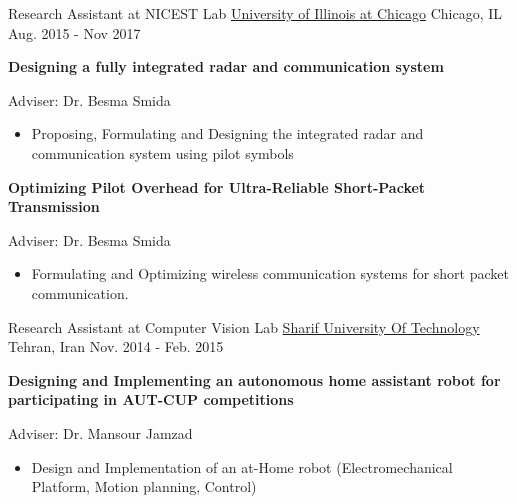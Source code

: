 \begin{cventries}

  \cventry
    {Research Assistant at NICEST Lab} %
    {\href{http://www.uic.edu}{University of Illinois at Chicago}} %
    {Chicago, IL} %
    {Aug. 2015 - Nov 2017} %
    {
      \begin{cvitems} %
		\item \textbf{Designing a fully integrated radar and communication system} \begin{flushright} {\color{awesome} Adviser: Dr. Besma Smida} \end{flushright}
		\begin{itemize}
				\item Proposing, Formulating and Designing the integrated radar and communication system using pilot symbols
		\end{itemize}
		\item \textbf{Optimizing Pilot Overhead for Ultra-Reliable Short-Packet Transmission} \begin{flushright} {\color{awesome} Adviser: Dr. Besma Smida} \end{flushright}
		\begin{itemize}
				\item Formulating and Optimizing wireless communication systems for short packet communication.
		\end{itemize}				      
      \end{cvitems}
    }





  \cventry
    {Research Assistant at Computer Vision Lab} %
    {\href{http://www.sharif.ir/web/en}{Sharif University Of Technology}} %
    {Tehran, Iran} %
    {Nov. 2014 - Feb. 2015} %
    {
      \begin{cvitems} %
			\item \textbf{Designing and Implementing an autonomous home assistant robot for participating in AUT-CUP competitions} \begin{flushright} {\color{awesome} Adviser: Dr. Mansour Jamzad} \end{flushright}
			\begin{itemize}
					\item Design and Implementation of an at-Home robot (Electromechanical Platform, Motion planning, Control)
			\end{itemize}
      \end{cvitems}
    }


\end{cventries}
